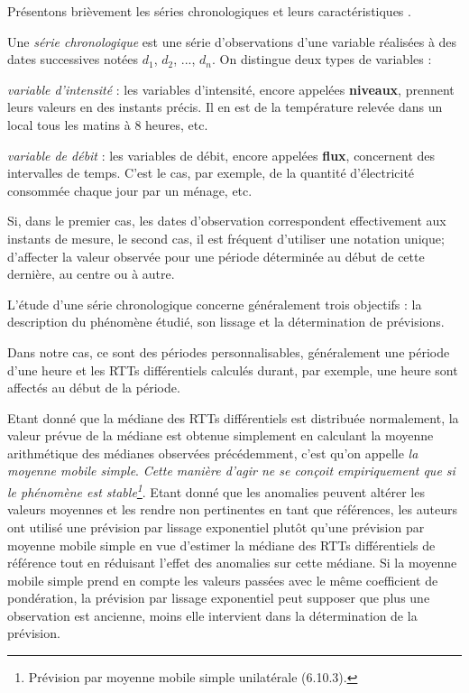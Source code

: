 Présentons  brièvement  les séries chronologiques et leurs caractéristiques \cite{elementdestatistiques}.   
\begin{tcolorbox}[before upper={\parindent15pt}]
	Une \textit{série chronologique} est une série d'observations d'une variable réalisées à des dates successives notées $d_1$, $d_2$, ..., $d_n$. On distingue deux types de variables :
	
	\textit{variable  d'intensité} : les variables d'intensité, encore appelées \textbf{niveaux}, prennent leurs valeurs en des instants précis. Il en est de la température relevée dans un local tous les matins à $8$ heures, etc.
	
	\textit{variable de débit} : les variables de débit, encore appelées \textbf{flux}, concernent des intervalles de temps. C'est le cas, par exemple, de la quantité d'électricité consommée chaque jour par un ménage, etc.
	
	Si, dans le premier cas, les dates d'observation correspondent effectivement aux instants de mesure, le second cas, il est fréquent d'utiliser une notation unique; d'affecter la valeur observée pour une période déterminée au début de cette dernière, au centre ou à autre.
	
	L'étude d'une série chronologique concerne généralement trois objectifs : la description du phénomène étudié, son lissage et la détermination de prévisions.
\end{tcolorbox}

Dans notre cas, ce sont des périodes personnalisables, généralement une période d'une heure et les RTTs différentiels calculés durant, par exemple, une heure sont affectés au début de la période.

Etant donné que la médiane des RTTs différentiels est distribuée normalement,  la valeur prévue de la médiane est obtenue simplement en calculant la moyenne arithmétique des médianes observées précédemment, c'est qu'on appelle \textit{la moyenne mobile simple}. \textit{Cette manière d'agir ne se conçoit empiriquement que si le phénomène est stable\footnote{Prévision par moyenne mobile simple unilatérale (6.10.3)\cite{elementdestatistiques}.}}.
Etant donné que les anomalies peuvent altérer les valeurs moyennes et les rendre non pertinentes en tant que références, les auteurs ont utilisé    une prévision par lissage exponentiel 
plutôt qu'une prévision par moyenne mobile simple  en vue d'estimer la médiane des RTTs différentiels de référence tout en réduisant l'effet des anomalies sur cette médiane.
Si  la moyenne mobile simple  prend en compte les valeurs passées avec le même coefficient de pondération,  la prévision par lissage exponentiel peut supposer que plus une observation est ancienne, moins elle intervient dans la détermination de la prévision. 

